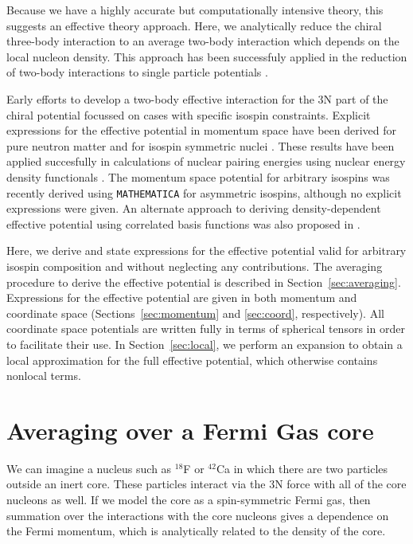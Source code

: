 \documentclass[%
 preprint,
 amsmath,amssymb,
 aps,
]{revtex4-1}
\begin{document}
Because we have a highly accurate but computationally intensive theory, this suggests an effective theory approach. Here, we analytically reduce the chiral three-body interaction to an average two-body interaction which depends on the local nucleon density. This approach has been successfuly applied in the reduction of two-body interactions to single particle potentials \cite{PhysRev.133.B329,AdelbergerHaxton}. 

Early efforts to develop a two-body effective interaction for the 3N part of the chiral potential focussed  on cases with specific isospin constraints. Explicit expressions for  the effective potential in momentum space have been derived for pure neutron matter \cite{PhysRevC.82.014314} and for isospin symmetric nuclei \cite{PhysRevC.81.024002}. These results have been applied succesfully in calculations of nuclear pairing energies using nuclear energy density functionals \cite{0954-3899-39-1-015108}. The momentum space potential for arbitrary isospins was recently derived using \texttt{MATHEMATICA} for asymmetric isospins, although no explicit expressions were given\cite{Drischler:2015eba}. An alternate approach to deriving density-dependent effective potential using correlated basis functions was also proposed in \cite{PhysRevC.83.054003}.

Here, we derive and state expressions for the effective potential valid for arbitrary isospin composition and without neglecting any contributions. The averaging procedure to derive the effective potential is described in Section~\ref{sec:averaging}. Expressions for the effective potential are given in both momentum and coordinate space (Sections~\ref{sec:momentum} and \ref{sec:coord}, respectively). All coordinate space potentials are written fully in terms of spherical tensors in order to facilitate their use. In Section~\ref{sec:local}, we perform an expansion to obtain a local approximation for the full effective potential, which otherwise contains nonlocal terms.

\section{\label{sec:averaging}Averaging over a Fermi Gas core}

We can imagine a nucleus such as $^{18}$F or $^{42}$Ca in which there are two particles outside an inert core. These particles interact via the 3N force with all of the core nucleons as well. If we model the core as a spin-symmetric Fermi gas, then summation over the interactions with the core nucleons gives a dependence on the Fermi momentum, which is analytically related to the density of the core. 
\end{document}
